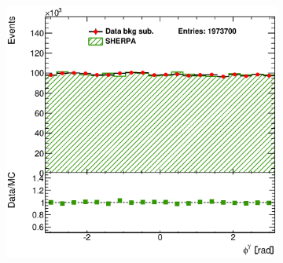 \documentclass[12pt, twoside]{article}
\numberwithin{equation}{section}
\numberwithin{figure}{section}
\newenvironment{changemargin}[2]{%
\begin{list}{}{%
\setlength{\topsep}{0pt}%
\setlength{\leftmargin}{#1}%
\setlength{\rightmargin}{#2}%
\setlength{\listparindent}{\parindent}%
\setlength{\itemindent}{\parindent}%
\setlength{\parsep}{\parskip}%
}%
\item[]}{\end{list}}
\begin{document}
\begin{figure}
\begin{changemargin}{-1.0cm}{-0.75cm}
\begin{changemargin}{-0.75cm}{-1.0cm}
\begin{subfigure}[b]{0.37\textwidth}
            \subcaption{}
            \label{fig:BSEtaPhotonSHERPA}
        \end{subfigure}
        \begin{subfigure}[b]{0.37\textwidth}
            \includegraphics[width=\textwidth]{./images/BackgroundSubtractedSherpa/SIG_EVENTS-103.eps}
            \subcaption{}
            \label{fig:BSPhiPhotonSHERPA}
        \end{subfigure}


\end{changemargin}
\end{changemargin}
\end{figure}
\end{document}
